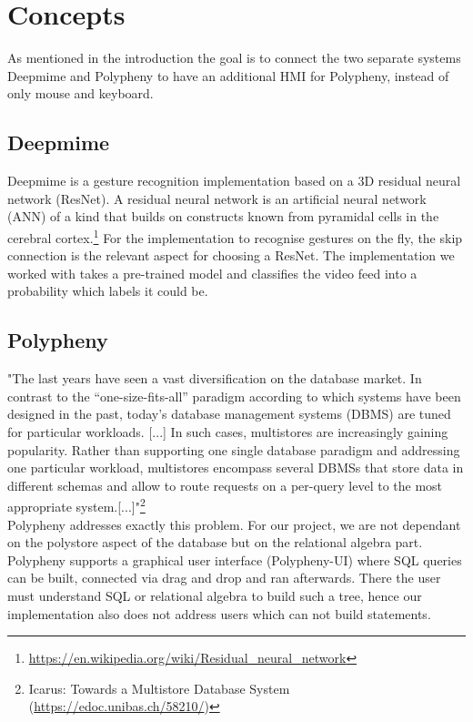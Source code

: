 \section{Concepts}
\label{g1:sec:concepts} %

As mentioned in the introduction the goal is to connect the two separate systems Deepmime and Polypheny to have an additional HMI for Polypheny, instead of only mouse and keyboard.

\subsection{Deepmime}
Deepmime is a gesture recognition implementation based on a 3D residual neural network (ResNet). A residual neural network is an artificial neural network (ANN) of a kind that builds on constructs known from pyramidal cells in the cerebral cortex.\footnote{\url{https://en.wikipedia.org/wiki/Residual_neural_network}} For the implementation to recognise gestures on the fly, the skip connection is the relevant aspect for choosing a ResNet. The implementation we worked with takes a pre-trained model and classifies the video feed into a probability which labels it could be. 


\subsection{Polypheny}
"The last years have seen a vast diversification on the database market. In contrast to the “one-size-fits-all” paradigm according to which systems have been designed in the past, today’s database management systems (DBMS) are tuned for particular workloads. {[}...{]} In such cases, multistores are increasingly gaining popularity. Rather than supporting one single database paradigm and addressing one particular workload, multistores encompass several DBMSs that store data in different schemas and allow to route requests on a per-query level to the most appropriate system.{[}...{]}"\footnote{Icarus: Towards a Multistore Database System (\url{https://edoc.unibas.ch/58210/})} 
\newline
\\
Polypheny addresses exactly this problem. For our project, we are not dependant on the polystore aspect of the database but on the relational algebra part. Polypheny supports a graphical user interface (Polypheny-UI) where SQL queries can be built, connected via drag and drop and ran afterwards. There the user must understand SQL or relational algebra to build such a tree, hence our implementation also does not address users which can not build statements.
